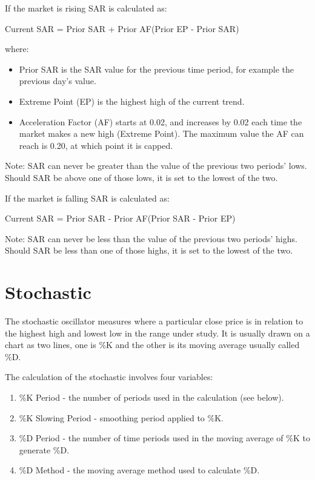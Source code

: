 If the market is rising SAR is calculated as:
\begin{center}
Current SAR = Prior SAR + Prior AF(Prior EP - Prior SAR)
\end{center}

where:\\
\begin{itemize}
\item Prior SAR is the SAR value for the previous time period, for example the previous day's value.
\item Extreme Point (EP) is the highest high of the current trend.
\item Acceleration Factor (AF) starts at 0.02, and increases by 0.02 each time the market makes a new high (Extreme Point). The maximum value the AF can reach is 0.20, at which point it is capped.
\end{itemize}
Note:  SAR can never be greater than the value of the previous two periods' lows. Should SAR be above one of those lows, it is set to the lowest of the two.

If the market is falling SAR is calculated as:
\begin{center}
Current SAR = Prior SAR - Prior AF(Prior SAR - Prior EP)
\end{center}
Note:  SAR can never be less than the value of the previous two periods' highs. Should SAR be less than one of those highs, it is set to the lowest of the two.

\section{Stochastic}
\label{appB:stoch}
The stochastic oscillator measures where a particular close price is in relation to the highest high and lowest low in the range under study. It is usually drawn on a chart as two lines, one is \%K and the other is its moving average usually called \%D.

The calculation of the stochastic involves four variables:
\begin{enumerate}
\item \%K Period - the number of periods used in the calculation (see below).
\item \%K Slowing Period - smoothing period applied to \%K.
\item \%D Period - the number of time periods used in the moving average of \%K to generate \%D.
\item \%D Method - the moving average method used to calculate \%D.
\end{enumerate}

